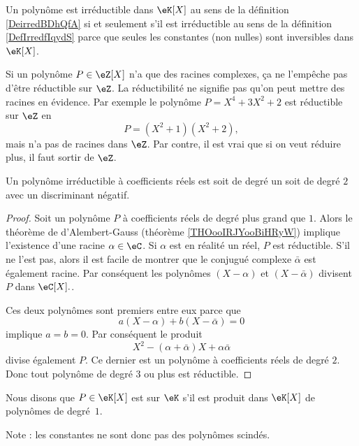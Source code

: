     Un polynôme est irréductible dans \( \eK[X]\) au sens de la définition \ref{DeirredBDhQfA} si et seulement s'il est irréductible au sens de la définition \ref{DefIrredfIqydS} parce que seules les constantes (non nulles) sont inversibles dans \( \eK[X]\).

\begin{example}
    Si un polynôme \( P\in \eZ[X]\) n'a que des racines complexes, ça ne l'empêche pas d'être réductible sur \( \eZ\). La réductibilité ne signifie pas qu'on peut mettre des racines en évidence. Par exemple le polynôme \( P=X^4+3X^2+2\) est réductible sur \( \eZ\) en
    \begin{equation}
        P=(X^2+1)(X^2+2),
    \end{equation}
    mais n'a pas de racines dans \( \eZ\). Par contre, il est vrai que si on veut réduire plus, il faut sortir de \( \eZ\).

\end{example}

\begin{proposition}
    Un polynôme irréductible à coefficients réels est soit de degré un soit de degré \( 2\) avec un discriminant négatif.
\end{proposition}

\begin{proof}
    Soit un polynôme \( P\) à coefficients réels de degré plus grand que \( 1\). Alors le théorème de d'Alembert-Gauss (théorème \ref{THOooIRJYooBiHRyW}) implique l'existence d'une racine \( \alpha \in \eC \). Si $\alpha$ est en réalité un réel, $P$ est réductible. S'il ne l'est pas, alors il est facile de montrer que le conjugué complexe \( \bar \alpha\) est également racine. Par conséquent les polynômes \( (X-\alpha)\) et \( (X-\bar \alpha)\) divisent \( P\) dans \( \eC[X]. \).

    Ces deux polynômes sont premiers entre eux parce que
    \begin{equation}
        a(X-\alpha)+b(X-\bar \alpha)=0
    \end{equation}
    implique \( a=b=0\). Par conséquent le produit 
    \begin{equation}
        X^2-(\alpha+\bar \alpha)X+\alpha\bar\alpha
    \end{equation}
    divise également \( P\). Ce dernier est un polynôme à coefficients réels de degré \( 2\). Donc tout polynôme de degré \( 3\) ou plus est réductible.
\end{proof}

\begin{definition}  \label{DefCPLSooQaHJKQ}
    Nous disons que \( P\in\eK[X]\) est  sur \(\eK\) s'il est produit dans \(\eK[X]\) de polynômes de degré~\( 1\). 
\end{definition}
Note : les constantes ne sont donc pas des polynômes scindés.

